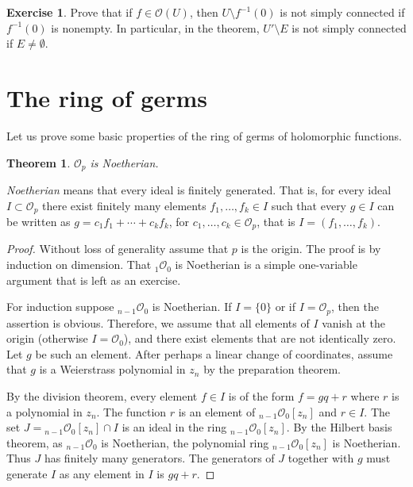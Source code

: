 \documentclass[12pt,openany]{book}
\newcommand{\sO}{{\mathscr{O}}}
\newcommand{\myindex}[1]{#1\index{#1}}
\newcommand{\sectionnewpage}{}
\theoremstyle{plain}
\newtheorem{thm}{Theorem}[section]
\theoremstyle{remark}
\theoremstyle{definition}
\newenvironment{exbox}{%
    \def\FrameCommand{\vrule width 1pt \relax\hspace {10pt}}%
    \MakeFramed {\advance \hsize -\width \FrameRestore }%
}{%
    \endMakeFramed
}
\theoremstyle{exercise}
\newtheorem{exercise}{Exercise}[section]
\theoremstyle{example}
\begin{document}
\begin{exbox}
\begin{exercise}
Prove that if $f \in \sO(U)$, then $U \setminus f^{-1}(0)$ is not simply
connected if $f^{-1}(0)$ is nonempty.  In particular, in the theorem, $U' \setminus E$ is not
simply connected if $E \not= \emptyset$.
\end{exercise}
\end{exbox}


\sectionnewpage
\section{The ring of germs} \label{sec:ring of germs}

Let us prove some basic properties of the
ring of germs of holomorphic functions.

\begin{thm}
$\sO_p$ is Noetherian.
\end{thm}

\emph{\myindex{Noetherian}} means that every ideal is finitely generated.
That is, for every ideal $I \subset \sO_p$
there exist finitely many elements $f_1,\ldots,f_k \in I$ such that
every $g \in I$ can be written as $g = c_1 f_1 + \cdots + c_k f_k$,
for $c_1,\ldots,c_k \in \sO_p$,
that is $I = (f_1,\ldots,f_k)$.

\begin{proof}
Without loss of generality assume that $p$ is the origin.  The proof is by
induction on dimension.  That ${}_1\sO_0$ is Noetherian is a simple
one-variable argument that is left as an exercise.

For induction suppose ${}_{n-1}\sO_0$ is Noetherian.  If $I = \{ 0 \}$
or if $I = \sO_p$, then the assertion is obvious.  Therefore, we assume
that all elements of $I$ vanish at the origin (otherwise $I = \sO_0$), and
there exist elements that are not identically zero.  Let $g$
be such an element.  After perhaps a linear change of coordinates, 
assume that $g$ is a Weierstrass polynomial in $z_n$
by the preparation theorem.

By the division theorem,
every element $f \in I$ is of the form $f = gq+r$ where $r$
is a polynomial in $z_n$.  The function 
$r$ is an element of ${}_{n-1}\sO_0[z_n]$ and $r \in I$.
The set $J= {}_{n-1}\sO_0[z_n] \cap I$ is an ideal in the
ring ${}_{n-1}\sO_0[z_n]$.  By the Hilbert basis theorem, as
${}_{n-1}\sO_0$ is Noetherian, the polynomial ring
${}_{n-1}\sO_0[z_n]$ is Noetherian.  Thus $J$ has finitely many generators.
The generators of $J$ together with $g$ must generate $I$ as any
element in $I$ is $gq+r$.
\end{proof}
\end{document}
